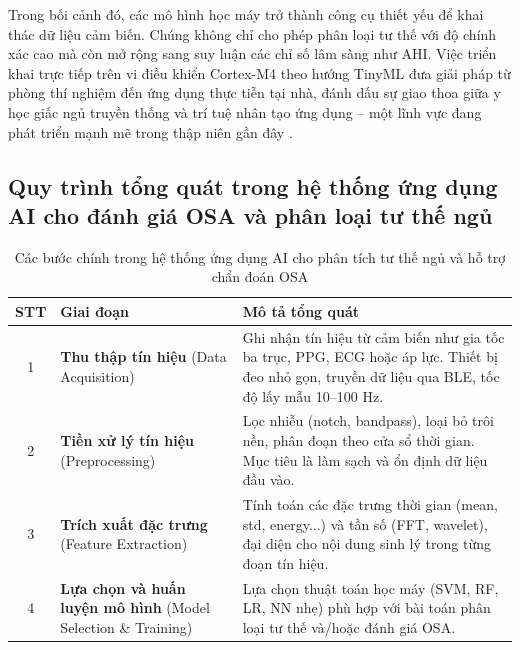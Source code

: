 Trong bối cảnh đó, các mô hình học máy trở thành công cụ thiết yếu để khai thác
dữ liệu cảm biến. Chúng không chỉ cho phép phân loại tư thế với độ chính xác
cao mà còn mở rộng sang suy luận các chỉ số lâm sàng như AHI. Việc triển khai
trực tiếp trên vi điều khiển Cortex-M4 theo hướng TinyML đưa giải pháp từ phòng
thí nghiệm đến ứng dụng thực tiễn tại nhà, đánh dấu sự giao thoa giữa y học
giấc ngủ truyền thống và trí tuệ nhân tạo ứng dụng – một lĩnh vực đang phát
triển mạnh mẽ trong thập niên gần đây \cite{osa_sanchez2025}.

\subsection{Quy trình tổng quát trong hệ thống ứng dụng AI cho đánh
  giá OSA và phân loại tư thế ngủ}
\begin{table}[htbp]
  \centering
  \caption{Các bước chính trong hệ thống ứng dụng AI cho phân tích tư thế ngủ và hỗ trợ chẩn đoán OSA}
  \label{tab:pipeline_steps}
  \small
  \renewcommand{\arraystretch}{1.2}
  \begin{tabular}{|c|p{3.8cm}|p{9.2cm}|}
    \hline
    \textbf{STT} & \textbf{Giai đoạn}                                                             & \textbf{Mô tả tổng quát}                                                                                                                         \\
    \hline
    1            & \textbf{Thu thập tín hiệu} \newline (Data Acquisition)                         & Ghi nhận tín hiệu từ cảm biến như gia tốc ba trục, PPG, ECG hoặc áp lực. Thiết bị đeo nhỏ gọn, truyền dữ liệu qua BLE, tốc độ lấy mẫu 10–100 Hz. \\
    \hline
    2            & \textbf{Tiền xử lý tín hiệu} \newline (Preprocessing)                          & Lọc nhiễu (notch, bandpass), loại bỏ trôi nền, phân đoạn theo cửa sổ thời gian. Mục tiêu là làm sạch và ổn định dữ liệu đầu vào.                 \\
    \hline
    3            & \textbf{Trích xuất đặc trưng} \newline (Feature Extraction)                    & Tính toán các đặc trưng thời gian (mean, std, energy...) và tần số (FFT, wavelet), đại diện cho nội dung sinh lý trong từng đoạn tín hiệu.       \\
    \hline
    4            & \textbf{Lựa chọn và huấn luyện mô hình} \newline (Model Selection \& Training) & Lựa chọn thuật toán học máy (SVM, RF, LR, NN nhẹ) phù hợp với bài toán phân loại tư thế và/hoặc đánh giá OSA.                                    \\

\end{tabular}
\end{table}
